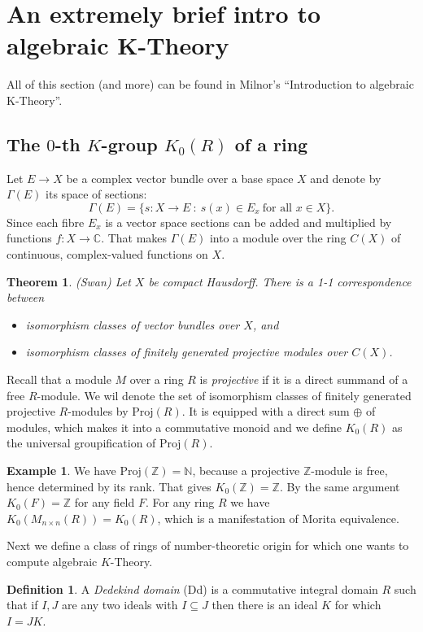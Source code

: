 \documentclass[a4paper,10pt]{article}
\theoremstyle{plain}%
\newtheorem{thm}{Theorem}
\theoremstyle{definition}
\newtheorem{defn}{Definition}
\newtheorem{exmp}{Example}
\theoremstyle{remark}
\newcommand{\NN}{\mathbb{N}}
\newcommand{\ZZ}{\mathbb{Z}}
\newcommand{\CC}{\mathbb{C}}
\newcommand{\proj}{\mathrm{Proj}}
\begin{document}
\section{An extremely brief intro to algebraic K-Theory}
All of this section (and more) can be found in Milnor's ``Introduction to algebraic K-Theory''.

\subsection{The $0$-th $K$-group $K_0(R)$ of a ring}

Let $E\to X$ be a complex vector bundle over a base space $X$ and denote by $\Gamma(E)$ its space of sections:
$$\Gamma(E)=\{s:X\to E~:~s(x)\in E_x\ \text{for all $x\in X$}\}.$$
Since each fibre $E_x$ is a vector space sections can be added and multiplied by functions $f:X\to\CC$. That makes $\Gamma(E)$ into a module over the ring $C(X)$ of continuous, complex-valued functions on $X$.

\begin{thm}
(Swan) Let $X$ be compact Hausdorff. There is a 1-1 correspondence between 
\begin{itemize}
\item isomorphism classes of vector bundles over $X$, and
\item isomorphism classes of finitely generated projective modules over $C(X)$.
\end{itemize}
\end{thm}

Recall that a module $M$ over a ring $R$ is \emph{projective} if it is a direct summand of a free $R$-module. We wil denote the set of isomorphism classes of finitely generated projective $R$-modules by $\proj(R)$. It is equipped with a direct sum $\oplus$ of modules, which makes it into a commutative monoid and we define $K_0(R)$ as the universal groupification of $\proj(R)$.

\begin{exmp}
We have $\proj(\ZZ)=\NN$, because a projective $\ZZ$-module is free, hence determined by its rank. That gives $K_0(\ZZ)=\ZZ$. By the same argument $K_0(F)=\ZZ$ for any field $F$. For any ring $R$ we have $K_0(M_{n\times n}(R))=K_0(R)$, which is a manifestation of Morita equivalence.
\end{exmp}

Next we define a class of rings of number-theoretic origin for which one wants to compute algebraic $K$-Theory.

\begin{defn}
A \emph{Dedekind domain} (Dd) is a commutative integral domain $R$ such that if $I,J$ are any two ideals with $I\subseteq J$ then there is an ideal $K$ for which $I=JK$.
\end{defn}
\end{document}
